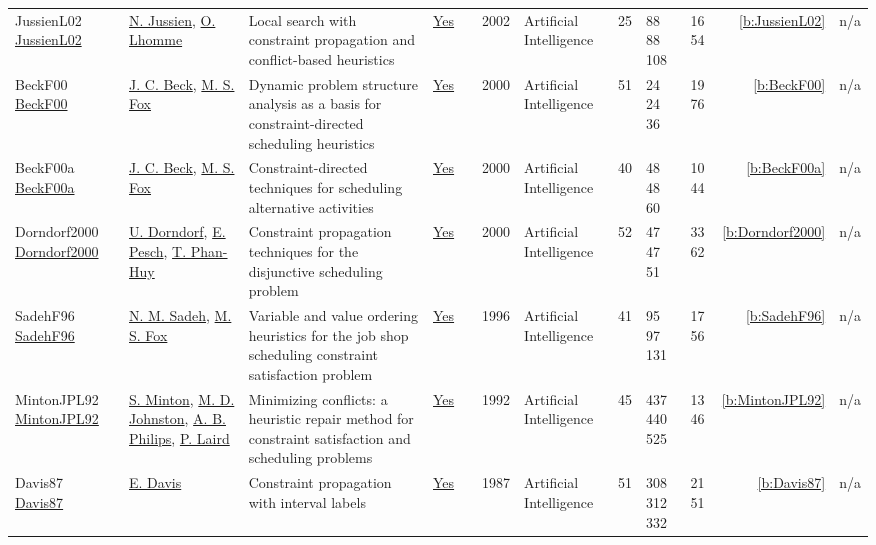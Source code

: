 {\begin{longtable}{>{\raggedright\arraybackslash}p{3cm}>{\raggedright\arraybackslash}p{4.5cm}>{\raggedright\arraybackslash}p{6.0cm}rrrp{2.5cm}rp{1cm}p{1cm}rr}
JussienL02 \href{http://dx.doi.org/10.1016/s0004-3702(02)00221-7}{JussienL02} & \hyperref[auth:a247]{N. Jussien}, \hyperref[auth:a1073]{O. Lhomme} & \cellcolor{gold!20}Local search with constraint propagation and conflict-based heuristics & \href{../works/JussienL02.pdf}{Yes} & \cite{JussienL02} & 2002 & Artificial Intelligence & 25 & 88 88 108 & 16 54 & \ref{b:JussienL02} & n/a\\
BeckF00 \href{https://doi.org/10.1016/S0004-3702(99)00099-5}{BeckF00} & \hyperref[auth:a89]{J. C. Beck}, \hyperref[auth:a302]{M. S. Fox} & \cellcolor{gold!20}Dynamic problem structure analysis as a basis for constraint-directed scheduling heuristics & \href{../works/BeckF00.pdf}{Yes} & \cite{BeckF00} & 2000 & Artificial Intelligence & 51 & 24 24 36 & 19 76 & \ref{b:BeckF00} & n/a\\
BeckF00a \href{http://dx.doi.org/10.1016/s0004-3702(00)00035-7}{BeckF00a} & \hyperref[auth:a89]{J. C. Beck}, \hyperref[auth:a302]{M. S. Fox} & \cellcolor{gold!20}Constraint-directed techniques for scheduling alternative activities & \href{../works/BeckF00a.pdf}{Yes} & \cite{BeckF00a} & 2000 & Artificial Intelligence & 40 & 48 48 60 & 10 44 & \ref{b:BeckF00a} & n/a\\
Dorndorf2000 \href{http://dx.doi.org/10.1016/s0004-3702(00)00040-0}{Dorndorf2000} & \hyperref[auth:a904]{U. Dorndorf}, \hyperref[auth:a438]{E. Pesch}, \hyperref[auth:a1047]{T. Phan-Huy} & \cellcolor{gold!20}Constraint propagation techniques for the disjunctive scheduling problem & \href{../works/Dorndorf2000.pdf}{Yes} & \cite{Dorndorf2000} & 2000 & Artificial Intelligence & 52 & 47 47 51 & 33 62 & \ref{b:Dorndorf2000} & n/a\\
SadehF96 \href{http://dx.doi.org/10.1016/0004-3702(95)00098-4}{SadehF96} & \hyperref[auth:a1044]{N. M. Sadeh}, \hyperref[auth:a302]{M. S. Fox} & \cellcolor{gold!20}Variable and value ordering heuristics for the job shop scheduling constraint satisfaction problem & \href{../works/SadehF96.pdf}{Yes} & \cite{SadehF96} & 1996 & Artificial Intelligence & 41 & 95 97 131 & 17 56 & \ref{b:SadehF96} & n/a\\
MintonJPL92 \href{http://dx.doi.org/10.1016/0004-3702(92)90007-k}{MintonJPL92} & \hyperref[auth:a1211]{S. Minton}, \hyperref[auth:a1212]{M. D. Johnston}, \hyperref[auth:a1213]{A. B. Philips}, \hyperref[auth:a1214]{P. Laird} & \cellcolor{green!10}Minimizing conflicts: a heuristic repair method for constraint satisfaction and scheduling problems & \href{../works/MintonJPL92.pdf}{Yes} & \cite{MintonJPL92} & 1992 & Artificial Intelligence & 45 & 437 440 525 & 13 46 & \ref{b:MintonJPL92} & n/a\\
Davis87 \href{http://dx.doi.org/10.1016/0004-3702(87)90091-9}{Davis87} & \hyperref[auth:a1216]{E. Davis} & \cellcolor{gold!20}Constraint propagation with interval labels & \href{../works/Davis87.pdf}{Yes} & \cite{Davis87} & 1987 & Artificial Intelligence & 51 & 308 312 332 & 21 51 & \ref{b:Davis87} & n/a\\
\end{longtable}
}

